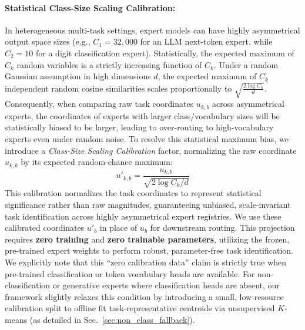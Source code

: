 \paragraph{Statistical Class-Size Scaling Calibration:}
In heterogeneous multi-task settings, expert models can have highly asymmetrical output space sizes (e.g., $C_1 = 32,000$ for an LLM next-token expert, while $C_2 = 10$ for a digit classification expert). Statistically, the expected maximum of $C_k$ random variables is a strictly increasing function of $C_k$. Under a random Gaussian assumption in high dimensions $d$, the expected maximum of $C_k$ independent random cosine similarities scales proportionally to $\sqrt{\frac{2\log C_k}{d}}$. Consequently, when comparing raw task coordinates $u_{k, b}$ across asymmetrical experts, the coordinates of experts with larger class/vocabulary sizes will be statistically biased to be larger, leading to over-routing to high-vocabulary experts even under random noise. To resolve this statistical maximum bias, we introduce a \emph{Class-Size Scaling Calibration} factor, normalizing the raw coordinate $u_{k, b}$ by its expected random-chance maximum:
\begin{equation}
u'_{k, b} = \frac{u_{k, b}}{\sqrt{2\log C_k / d}}
\label{eq:asymmetrical_calibration}
\end{equation}
This calibration normalizes the task coordinates to represent statistical significance rather than raw magnitudes, guaranteeing unbiased, scale-invariant task identification across highly asymmetrical expert registries. We use these calibrated coordinates $u'_b$ in place of $u_b$ for downstream routing. This projection requires \textbf{zero training} and \textbf{zero trainable parameters}, utilizing the frozen, pre-trained expert weights to perform robust, parameter-free task identification. We explicitly note that this ``zero calibration data'' claim is strictly true when pre-trained classification or token vocabulary heads are available. For non-classification or generative experts where classification heads are absent, our framework slightly relaxes this condition by introducing a small, low-resource calibration split to offline fit task-representative centroids via unsupervised $K$-means (as detailed in Sec.~\ref{sec:non_class_fallback}).

